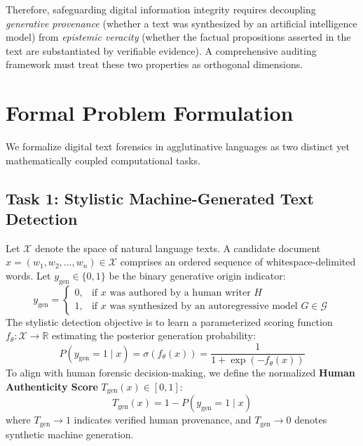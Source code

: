 Therefore, safeguarding digital information integrity requires decoupling \textit{generative provenance} (whether a text was synthesized by an artificial intelligence model) from \textit{epistemic veracity} (whether the factual propositions asserted in the text are substantiated by verifiable evidence). A comprehensive auditing framework must treat these two properties as orthogonal dimensions.

\section{Formal Problem Formulation}
\label{sec:intro_problem_formulation}

We formalize digital text forensics in agglutinative languages as two distinct yet mathematically coupled computational tasks.

\subsection{Task 1: Stylistic Machine-Generated Text Detection}
Let $\mathcal{X}$ denote the space of natural language texts. A candidate document $x = (w_1, w_2, \dots, w_n) \in \mathcal{X}$ comprises an ordered sequence of whitespace-delimited words. Let $y_{\text{gen}} \in \{0, 1\}$ be the binary generative origin indicator:
\begin{equation}
y_{\text{gen}} = \begin{cases}
0, & \text{if } x \text{ was authored by a human writer } H \\
1, & \text{if } x \text{ was synthesized by an autoregressive model } G \in \mathcal{G}
\end{cases}
\end{equation}
The stylistic detection objective is to learn a parameterized scoring function $f_\theta: \mathcal{X} \rightarrow \mathbb{R}$ estimating the posterior generation probability:
\begin{equation}
P(y_{\text{gen}} = 1 \mid x) = \sigma(f_\theta(x)) = \frac{1}{1 + \exp(-f_\theta(x))}
\end{equation}
To align with human forensic decision-making, we define the normalized \textbf{Human Authenticity Score} $T_{\text{gen}}(x) \in [0, 1]$:
\begin{equation}
\label{eq:intro_t_gen_def}
T_{\text{gen}}(x) = 1 - P(y_{\text{gen}} = 1 \mid x)
\end{equation}
where $T_{\text{gen}} \rightarrow 1$ indicates verified human provenance, and $T_{\text{gen}} \rightarrow 0$ denotes synthetic machine generation.


